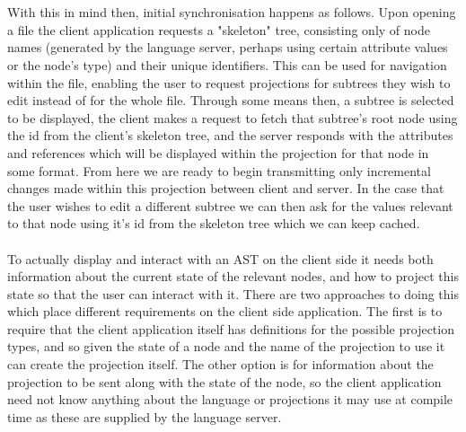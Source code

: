 \documentclass{report}
\begin{document}
\\
\\
With this in mind then, initial synchronisation happens as follows. Upon opening a file the client application requests a "skeleton" tree, consisting only of node names (generated by the language server, perhaps using certain attribute values or the node's type) and their unique identifiers. This can be used for navigation within the file, enabling the user to request projections for subtrees they wish to edit instead of for the whole file. Through some means then, a subtree is selected to be displayed, the client makes a request to fetch that subtree's root node using the id from the client's skeleton tree, and the server responds with the attributes and references which will be displayed within the projection for that node in some format. From here we are ready to begin transmitting only incremental changes made within this projection between client and server. In the case that the user wishes to edit a different subtree we can then ask for the values relevant to that node using it's id from the skeleton tree which we can keep cached.
\\
\\
To actually display and interact with an AST on the client side it needs both information about the current state of the relevant nodes, and how to project this state so that the user can interact with it. 
There are two approaches to doing this which place different requirements on the client side application. The first is to require that the client application itself has definitions for the possible projection types, and so given the state of a node and the name of the projection to use it can create the projection itself. The other option is for information about the projection to be sent along with the state of the node, so the client application need not know anything about the language or projections it may use at compile time as these are supplied by the language server.
\\
\\
\end{document}
